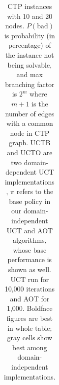 \documentclass[letterpaper]{article}
\newcommand{\G}{\cellcolor[gray]{0.75}}
\begin{document}
\begin{table}[t]
{\begin{minipage}{7.3in}
\begin{tabular}{l@{}rr@{}r rr rrr rrr}
      \bottomrule
    \end{tabular}
  \end{minipage}
}
\caption{\small  CTP instances with 10 and 20 nodes. $P(\text{bad})$ is probability (in percentage) of
  the instance not being solvable,
  and max branching factor is $2^m$ where $m+1$ is the number of edges with a common node in CTP graph.
  UCTB and UCTO are  two domain-dependent UCT implementations \cite{malte:ctp}, $\pi$ refers to the base
  policy in our domain-independent UCT and  AOT algorithms, whose  base performance is shown as well.
  UCT run for 10,000 iterations and AOT for 1,000. Boldface figures are best in whole table; gray cells show
  best among domain-independent implementations.}
\label{table:results:ctp}
\end{table}
\end{document}
